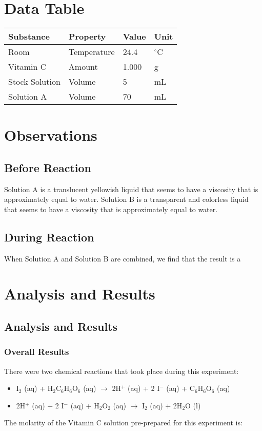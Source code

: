 \documentclass[11pt]{article}
\begin{document}
\section{Data Table}
\begin{tabular}{ | l | l | l | l |}
\hline \textbf{\large{Substance}} & \textbf{\large{Property}} & \textbf{\large{Value}} & \textbf{\large{Unit}}\\ \hline
	Room 			& Temperature	& 24.4  & $^\circ$C\\ \hline
	Vitamin C		& Amount		& 1.000 & g			\\ \hline
	Stock Solution	& Volume		& 5  	& mL		\\ \hline
	Solution A 		& Volume		& 70 	& mL		\\ \hline

\end{tabular}

\section{Observations}
	\subsection{Before Reaction}
	Solution A is a translucent yellowish liquid that seems to have a viscosity that is approximately equal to water. Solution B is a transparent and colorless liquid that seems to have a viscosity that is approximately equal to water.
	\subsection{During Reaction}
	When Solution A and Solution B are combined, we find that the result is a 

\section{Analysis and Results}
\subsection{Analysis and Results}
\subsubsection{Overall Results}
There were two chemical reactions that took place during this experiment:
\begin{itemize}
\item I$_{2}$ (aq) +  H$_{2}$C$_{6}$H$_{6}$O$_{6}$ (aq)  $\rightarrow$ 2H$^{+}$ (aq) + 2 I$^{-}$ (aq) + C$_{6}$H$_{6}$O$_{6}$ (aq)
\item 2H$^{+}$ (aq) + 2 I$^{-}$ (aq) + H$_{2}$O$_{2}$ (aq) $\rightarrow$ I$_{2}$ (aq) + 2H$_{2}$O (l)
\end{itemize}
The molarity of the Vitamin C solution pre-prepared for this experiment is:
\end{document}
